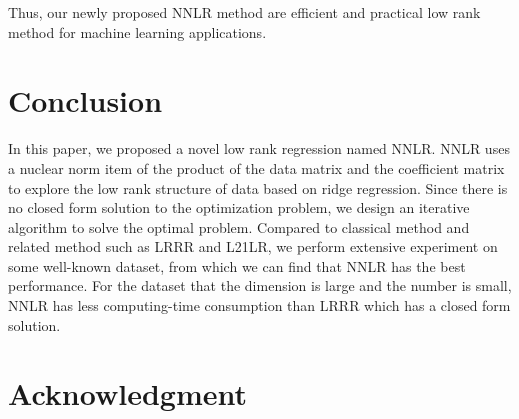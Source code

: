 \documentclass{ieeeaccess}
\begin{document}
Thus, our newly proposed NNLR method are efficient and practical low rank method for machine learning applications.

\section{Conclusion}

In this paper, we proposed a novel low rank regression named NNLR. NNLR uses a nuclear norm item of the product of the data matrix and the coefficient matrix to explore the low rank structure of data based on ridge regression. Since there is no closed form solution to the optimization problem, we design an iterative algorithm to solve the optimal problem. Compared to classical method and related method such as LRRR and L21LR, we perform extensive experiment on some well-known dataset, from which we can find that NNLR has the best performance. For the dataset that the dimension is large and the number is small, NNLR has less computing-time consumption than LRRR which has a closed form solution.


\section*{Acknowledgment}


%
%
%



\end{document}

